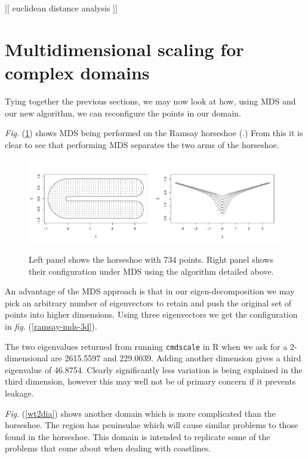\documentclass[a4paper,10pt]{amsart}
\newcommand{\fig}[1]{\emph{fig.} (\ref{#1})}
\newcommand{\Fig}[1]{\emph{Fig.} (\ref{#1})}
\begin{document}
[[ euclidean distance analysis ]]


\section{Multidimensional scaling for complex domains}

Tying together the previous sections, we may now look at how, using MDS and our new algorithm, we can reconfigure the points in our domain.

\Fig{ramsay-mds} shows MDS being performed on the Ramsay horseshoe (\cite{ramsay}.) From this it is clear to see that performing MDS separates the two arms of the horseshoe.

\begin{figure}
\centering
\includegraphics[trim=0in 0.5in 0in 0.25in, width=5.5in]{figs/ramsay-mds.pdf} \\
\caption{Left panel shows the horseshoe with 734 points. Right panel shows their configuration under MDS using the algorithm detailed above.}
\label{ramsay-mds}
\end{figure}

An advantage of the MDS approach is that in our eigen-decomposition we may pick an arbitrary number of eigenvectors to retain and push the original set of points into higher dimensions. Using three eigenvectors we get the configuration in \fig{ramsay-mds-3d}.

The two eigenvalues returned from running \texttt{cmdscale} in \textsf{R} when we ask for a 2-dimensional are 2615.5597 and 229.0039. Adding another dimension gives a third eigenvalue of 46.8754. Clearly significantly less variation is being explained in the third dimension, however this may well not be of primary concern if it prevents leakage.


\Fig{wt2dia} shows another domain which is more complicated than the horseshoe. The region has peninsulae which will cause similar problems to those found in the horseshoe. This domain is intended to replicate some of the problems that come about when dealing with coastlines.
\end{document}
